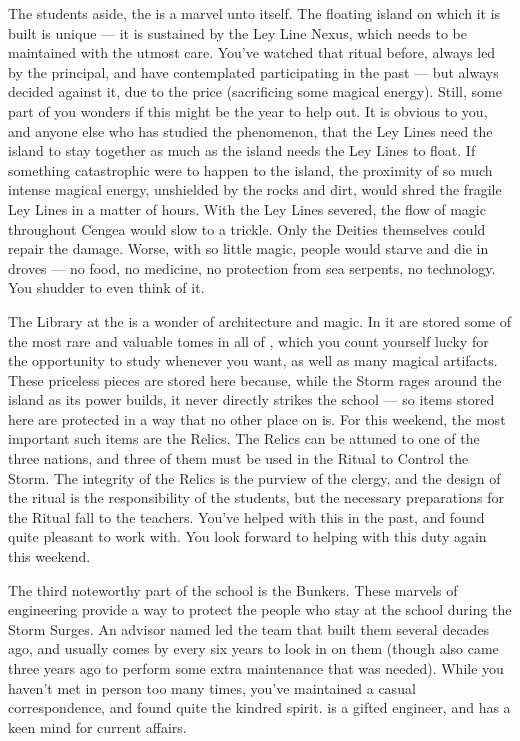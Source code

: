 \documentclass[char]{GL2020}
\begin{document}
The students aside, the \pSc{} is a marvel unto itself. The floating island on which it is built is unique — it is sustained by the Ley Line Nexus, which needs to be maintained with the utmost care. You've watched that ritual before, always led by the principal, and have contemplated participating in the past — but always decided against it, due to the price (sacrificing some magical energy). Still, some part of you wonders if this might be the year to help out. It is obvious to you, and anyone else who has studied the phenomenon, that the Ley Lines need the island to stay together as much as the island needs the Ley Lines to float. If something catastrophic were to happen to the island, the proximity of so much intense magical energy, unshielded by the rocks and dirt, would shred the fragile Ley Lines in a matter of hours. With the Ley Lines severed, the flow of magic throughout Cengea would slow to a trickle. Only the Deities themselves could repair the damage. Worse, with so little magic, people would starve and die in droves — no food, no medicine, no protection from sea serpents, no technology. You shudder to even think of it.

The Library at the \pSc{} is a wonder of architecture and magic. In it are stored some of the most rare and valuable tomes in all of \pEarth{}, which you count yourself lucky for the opportunity to study whenever you want, as well as many magical artifacts. These priceless pieces are stored here because, while the Storm rages around the island as its power builds, it never directly strikes the school — so items stored here are protected in a way that no other place on \pEarth{} is. For this weekend, the most important such items are the Relics. The Relics can be attuned to one of the three nations, and three of them must be used in the Ritual to Control the Storm. The integrity of the Relics is the purview of the clergy, and the design of the ritual is the responsibility of the students, but the necessary preparations for the Ritual fall to the teachers. You've helped \cLibrarian{\full} with this in the past, and found \cLibrarian{\them} quite pleasant to work with. You look forward to helping with this duty again this weekend.

The third noteworthy part of the school is the Bunkers. These marvels of engineering provide a way to protect the people who stay at the school during the Storm Surges. An advisor named \cBunker{\full} led the team that built them several decades ago, and usually comes by every six years to look in on them (though \cBunker{\they} also came three years ago to perform some extra maintenance that was needed). While you haven't met \cBunker{\them} in person too many times, you've maintained a casual correspondence, and found quite the kindred spirit. \cBunker{} is a gifted engineer, and has a keen mind for current affairs.
\end{document}
